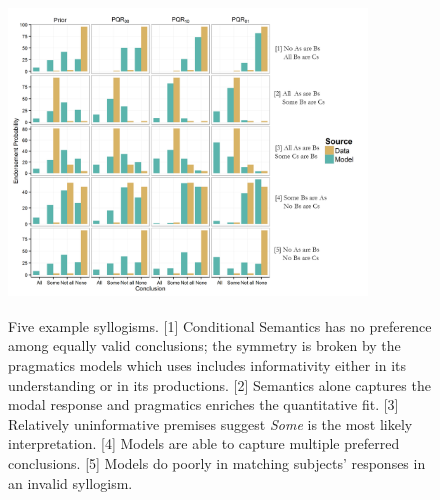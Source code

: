 \documentclass[10pt,letterpaper]{article}
\begin{document}
\begin{figure}
\centering
    \includegraphics[width=0.85\textwidth,height=8.5cm]{fig1_multibar_alpha2_br25_n6_diverge_wtitles}
    \caption{Five example syllogisms. 
    [1] Conditional Semantics has no preference among equally valid conclusions; the symmetry is broken by the pragmatics models which uses includes informativity either in its understanding or in its productions.     
    [2] Semantics alone captures the modal response and pragmatics enriches the quantitative fit.     
    [3] Relatively uninformative premises suggest \emph{Some} is the most likely interpretation. 
    [4] Models are able to capture multiple preferred conclusions. 
    [5] Models do poorly in matching subjects' responses in an invalid syllogism.}
  \label{fig:barplots}
\end{figure}
\end{document}
